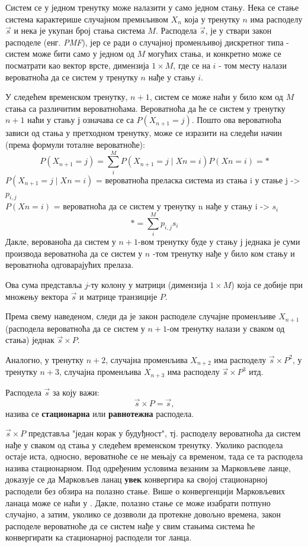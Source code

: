 Систем се у једном тренутку може налазити у само једном стању. Нека се стање система карактерише случајном премнљивом  $X_n$ која у тренутку $n$  има расподелу $\overrightarrow{s}$ и нека је укупан број стања система $M$. Расподела $\overrightarrow{s}$, је у ствари закон расподеле (енг. \textit{PMF}), јер се ради о случајној променљивој дискретног типа - систем може бити само у једном од  $M$ могућих стања, и конкретно може се посматрати као вектор врсте, димензија $1\times M$, где се на $i$ - том месту налази вероватноћа да се систем у тренутку $n$ нађе у стању $i$.
 
У следећем временском тренутку, $n+1$, систем се може наћи у било ком од $M$ стања са различитим вероватноћама. Вероватноћа да ће се систем у тренутку  $n+1$  наћи у стању $ј$ означава се са $P(X_{n+1} = j)$. Пошто ова вероватноћа зависи од стања у претходном тренутку, може се изразити на следећи начин (према формули тоталне вероватноће):
$$
P(X_{n+1} = j) = \sum_{i}^{M} P(X_{n+1}=j \mid X{n}=i)P(X{n}=i) = *  $$
$P(X_{n+1}=j \mid X{n}=i)$ = вероватноћа преласка система из стања i у стање j  -> $p_{i,j} $ \\
$P(X{n}=i)$ = вероватноћа да се систем у тренутку n нађе у стању i -> $s_i$
$$
* = \sum_{i}^{M} p_{i,j}s_{i}
$$
Дакле, верованоћа да систем у $n+1$-вом тренутку буде у стању $ј$ једнака је суми производа вероватноћа да се систем у $n$ -том тренутку нађе у било ком стању и вероватноћа одговарајућих прелаза.

Ова сума представља $j$-ту колону у матрици (димензија $1 \times M$) која се добије при множењу вектора  $\overrightarrow{s}$ и матрице транзиције $P$.

Према свему наведеном, следи да је закон расподеле случајне променљиве $X_{n+1}$ (расподела вероватноћа да се систем у  $n+1$-ом тренутку налази у сваком од стања) једнак $\overrightarrow{s} \times P$.

Аналогно, у тренутку  $n+2$, случајна променљива  $X_{n+2}$ има расподелу  $\overrightarrow{s} \times P^2$, у тренутку $n+3$, случајна променљива $X_{n+3}$ има расподелу  $\overrightarrow{s} \times P^3$ итд.

\begin{de}
Расподела  $\overrightarrow{s}$ за коју важи: 
$$
\overrightarrow{s} \times P = \overrightarrow{s},
$$
назива се \textbf{стационарна} или \textbf{равнотежна} расподела. 
\end{de}
$\overrightarrow{s} \times P$ представља "један корак у будуђност", тј. расподелу вероватноћа да систем нађе у сваком од стања у следећем временском тренутку. Уколико расподела остаје иста, односно, вероватноће се не мењају са временом, тада се та расподела назива стационарном. Под одређеним условима везаним за Марковљеве ланце, доказује се да Марковљев ланац \textbf{увек} конвергира ка својој стационарној расподели без обзира на полазно стање. Више о конвергенцији Марковљевих ланаца може се наћи у \cite{verov6}. Дакле, полазно стање се може изабрати потпуно случајно, а затим, уколико се дозвволи да протекне довољно времена, закон расподеле вероватноће да се систем нађе у свим стањима система ће конвергирати ка стационарној расподели тог ланца.


